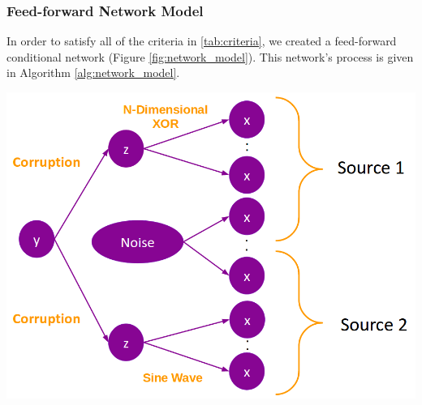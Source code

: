 \documentclass{article}
\begin{document}
\subsubsection*{Feed-forward Network Model}

In order to satisfy all of the criteria in \ref{tab:criteria}, we created a
feed-forward conditional network (Figure \ref{fig:network_model}).
This network's process is given in Algorithm \ref{alg:network_model}.

\begin{minipage}{\textwidth}
    \centering
    \includegraphics[scale=0.4]{network_model.png}
    \label{fig:network_model}
\end{minipage}
\end{document}

